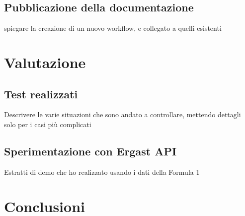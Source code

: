 \documentclass[12pt,a4paper,openright,twoside]{book}
\begin{document}
\section{Pubblicazione della documentazione}
spiegare la creazione di un nuovo workflow, e collegato a quelli esistenti
\chapter{Valutazione}

\section{Test realizzati}
Descrivere le varie situazioni che sono andato a controllare,
mettendo dettagli solo per i casi più complicati

\section{Sperimentazione con Ergast API}
Estratti di demo che ho realizzato usando i dati della Formula 1
\chapter{Conclusioni}





%
%
%



\end{document}
